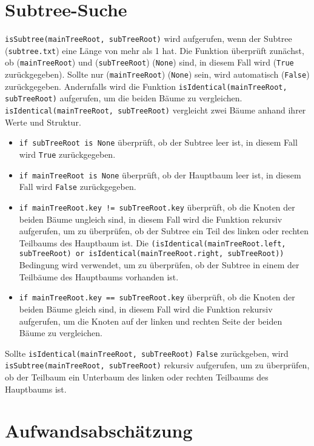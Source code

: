\documentclass{article}
\begin{document}
\section*{Subtree-Suche}
\texttt{isSubtree(mainTreeRoot, subTreeRoot)} wird aufgerufen, wenn der Subtree (\texttt{subtree.txt}) eine Länge von mehr als 1 hat. Die Funktion überprüft zunächst, ob (\texttt{mainTreeRoot}) und (\texttt{subTreeRoot}) (\texttt{None}) sind, in diesem Fall wird (\texttt{True} zurückgegeben).
Sollte nur (\texttt{mainTreeRoot}) (\texttt{None}) sein, wird automatisch (\texttt{False}) zurückgegeben. Andernfalls wird die Funktion \texttt{isIdentical(mainTreeRoot, subTreeRoot)} aufgerufen, um die beiden Bäume zu vergleichen.
\texttt{isIdentical(mainTreeRoot, subTreeRoot)} vergleicht zwei Bäume anhand ihrer Werte und Struktur.
\begin{itemize}
    \item \texttt{if subTreeRoot is None} überprüft, ob der Subtree leer ist, in diesem Fall wird \texttt{True} zurückgegeben.
    \item \texttt{if mainTreeRoot is None} überprüft, ob der Hauptbaum leer ist, in diesem Fall wird \texttt{False} zurückgegeben.
    \item \texttt{if mainTreeRoot.key != subTreeRoot.key} überprüft, ob die Knoten der beiden Bäume ungleich sind, in diesem Fall wird die Funktion rekursiv aufgerufen, um zu überprüfen, ob der Subtree ein Teil des linken oder rechten Teilbaums des Hauptbaum ist.
    Die \texttt{(isIdentical(mainTreeRoot.left, subTreeRoot) or isIdentical(mainTreeRoot.right, subTreeRoot))} Bedingung wird verwendet, um zu überprüfen, ob der Subtree in einem der Teilbäume des Hauptbaums vorhanden ist.
    \item \texttt{if mainTreeRoot.key == subTreeRoot.key} überprüft, ob die Knoten der beiden Bäume gleich sind, in diesem Fall wird die Funktion rekursiv aufgerufen, um die Knoten auf der linken und rechten Seite der beiden Bäume zu vergleichen.
\end{itemize}
Sollte \texttt{isIdentical(mainTreeRoot, subTreeRoot)} \texttt{False} zurückgeben, wird \texttt{isSubtree(mainTreeRoot, subTreeRoot)} rekursiv aufgerufen, um zu überprüfen, ob der Teilbaum ein Unterbaum des linken oder rechten Teilbaums des Hauptbaums ist.

\section*{Aufwandsabschätzung}
\end{document}
